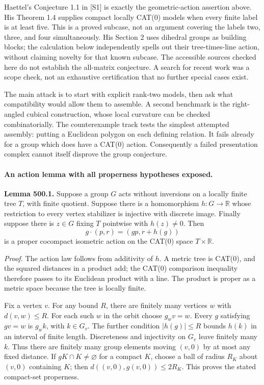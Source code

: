 \documentclass[11pt]{article}
\begin{document}
Haettel's Conjecture 1.1 in [S1] is exactly the geometric-action assertion
above. His Theorem 1.4 supplies compact locally CAT(0) models when every
finite label is at least five. This is a proved subcase, not an argument
covering the labels two, three, and four simultaneously. His Section 2 uses
dihedral groups as building blocks; the calculation below independently
spells out their tree-times-line action, without claiming novelty for that
known subcase. The accessible sources checked here do not establish the
all-matrix conjecture. A search for recent work was a scope check, not an
exhaustive certification that no further special cases exist.

The main attack is to start with explicit rank-two models, then ask what
compatibility would allow them to assemble. A second benchmark is the
right-angled cubical construction, whose local curvature can be checked
combinatorially. The counterexample track tests the simplest attempted
assembly: putting a Euclidean polygon on each defining relation. It fails
already for a group which does have a CAT(0) action. Consequently a failed
presentation complex cannot itself disprove the group conjecture.

\paragraph{An action lemma with all properness hypotheses exposed.}
\textbf{Lemma 500.1.}
Suppose a group $G$ acts without inversions on a locally finite tree $T$,
with finite quotient. Suppose there is a homomorphism $h:G\to\mathbb R$
whose restriction to every vertex stabilizer is injective with discrete
image. Finally suppose there is $z\in G$ fixing $T$ pointwise with
$h(z)\ne0$. Then
\[
 g\cdot(p,r)=(gp,r+h(g))
\]
is a proper cocompact isometric action on the CAT(0) space
$T\times\mathbb R$.

\emph{Proof.}
The action law follows from additivity of $h$. A metric tree is CAT(0),
and the squared distances in a product add; the CAT(0) comparison inequality
therefore passes to its Euclidean product with a line. The product is proper
as a metric space because the tree is locally finite.

Fix a vertex $v$. For any bound $R$, there are finitely many vertices $w$
with $d(v,w)\le R$. For each such $w$ in the orbit choose $g_wv=w$.
Every $g$ satisfying $gv=w$ is $g_wk$, with $k\in G_v$.
The further condition $|h(g)|\le R$ bounds $h(k)$ in an interval of finite
length. Discreteness and injectivity on $G_v$ leave finitely many $k$.
Thus there are finitely many group elements moving $(v,0)$ by at most any
fixed distance. If $gK\cap K\ne\varnothing$ for a compact $K$, choose a
ball of radius $R_K$ about $(v,0)$ containing $K$; then
$d((v,0),g(v,0))\le2R_K$. This proves the stated compact-set properness.
\end{document}
